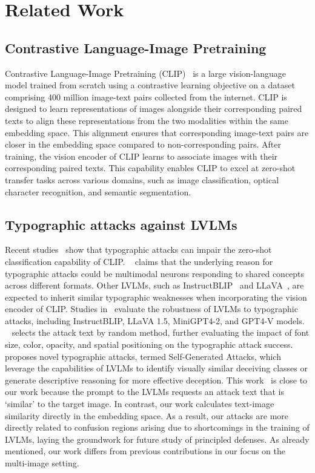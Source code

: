 \section{Related Work}
\subsection{Contrastive Language-Image Pretraining}
Contrastive Language-Image Pretraining (CLIP)~\citep{clip} is a large vision-language model trained from scratch using a contrastive learning objective on a dataset comprising 400 million image-text pairs collected from the internet. 
CLIP is designed to learn representations of images alongside their corresponding paired texts to align these representations from the two modalities within the same embedding space.
This alignment ensures that corresponding image-text pairs are closer in the embedding space compared to non-corresponding pairs.
After training, the vision encoder of CLIP learns to associate images with their corresponding paired texts. 
This capability enables CLIP to excel at zero-shot transfer tasks across various domains, such as image classification, optical character recognition, and semantic segmentation. 

\subsection{Typographic attacks against LVLMs}
Recent studies~\citep{multi_neurons, azuma2023defense, noever2021reading} show that typographic attacks can impair the zero-shot classification capability of CLIP. 
~\citet{multi_neurons} claims that the underlying reason for typographic attacks could be multimodal neurons responding to shared concepts across different formats.
Other LVLMs, such as InstructBLIP~\citep{dai2023instructblip} and LLaVA~\citep{llava}, are expected to inherit similar typographic weaknesses when incorporating the vision encoder of CLIP. 
Studies in~\citet{self_typo, typo_mllms} evaluate the robustness of LVLMs to typographic attacks, including InstructBLIP, LLaVA 1.5, MiniGPT4-2, and GPT4-V models.
~\citet{typo_mllms} selects the attack text by random method, further evaluating the impact of font size, color, opacity, and spatial positioning on the typographic attack success.
~\citet{self_typo} proposes novel typographic attacks, termed Self-Generated Attacks, which leverage the capabilities of LVLMs to identify visually similar deceiving classes or generate descriptive reasoning for more effective deception.
This work~\citep{self_typo} is close to our work because the prompt to the LVLMs requests an attack text that is `similar' to the target image.
In contrast, our work calculates text-image similarity directly in the embedding space. 
As a result, our attacks are more directly related to confusion regions arising due to shortcomings in the training of LVLMs, laying the groundwork for future study of principled defenses.
As already mentioned, our work differs from previous contributions in our focus on the multi-image setting.



